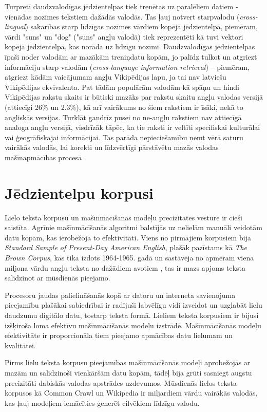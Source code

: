 Turpretī daudzvalodīgas jēdzientelpas tiek trenētas uz paralēliem datiem - vienādas nozīmes tekstiem dažādās valodās. Tas ļauj notvert starpvalodu (\textit{cross-lingual}) sakarības starp līdzīgas nozīmes vārdiem kopējā jēdzientelpā, piemēram, vārdi "suns" un "dog" ("suns" angļu valodā) tiek reprezentēti kā tuvi vektori kopējā jēdzientelpā, kas norāda uz līdzīgu nozīmi. Daudzvalodīgas jēdzientelpas īpaši noder valodām ar mazākām treniņdatu kopām, jo palīdz tulkot un atgriezt informāciju starp valodām (\textit{cross-language information retrieval}) -- piemēram, atgriezt kādām vaicājumam angļu Vikipēdijas lapu, ja tai nav latviešu Vikipēdijas ekvivalenta. Pat tādām populārām valodām kā spāņu un hindi Vikipēdijas rakstu skaits ir būtiski mazāks par rakstu skaitu angļu valodas versijā (attiecīgi 26\% un 2.3\%), kā arī vairākums no šiem rakstiem ir īsāki, nekā to angliskās versijas. Turklāt gandrīz pusei no ne-angļu rakstiem nav attiecīgā analoga angļu versijā, visdrīzāk tāpēc, ka tie raksti ir veltīti specifiskai kulturālai vai ģeogrāfiskajai informācijai. Tas parāda nepieciešamību ņemt vērā saturu vairākās valodās, lai korekti un līdzvērtīgi pārstāvētu mazās valodas mašīnapmācības procesā \cite{roy2020}.


\section{Jēdzientelpu korpusi}


Lielo teksta korpusu un mašīnmācīšanās modeļu precizitātes vēsture ir cieši saistīta. Agrīnie mašīnmācīšanās algoritmi balstījās uz nelielām manuāli veidotām datu kopām, kas ierobežoja to efektivitāti. Viens no pirmajiem korpusiem bija \textit{Standard Sample of Present-Day American English}, plašāk pazīstams kā \textit{The Brown Corpus}, kas tika izdots 1964-1965. gadā un sastāvēja no apmēram viena miljona vārdu angļu teksta no dažādiem avotiem \cite{brown-corpus}, tas ir mazs apjoms teksta salīdzinot ar mūsdienās pieejamo.

Procesoru jaudas palielināšanās kopā ar datoru un interneta savienojuma pieejamību plašākai sabiedrībai ir radījuši labvēlīgu vidi izveidot un uzglabāt lielu daudzumu digitālo datu, tostarp teksta formā. Lieliem teksta korpusiem ir bijusi izšķiroša loma efektīvu mašīnmācīšanās modeļu izstrādē. Mašīnmācīšanās modeļu efektivitāte ir proporcionāla tiem pieejamo apmācības datu lielumam un kvalitātei. %

Pirms lielu teksta korpusu pieejamības mašīnmācīšanās modeļi aprobežojās ar mazām un salīdzinoši vienkāršām datu kopām, tādēļ bija grūti sasniegt augstu precizitāti dabiskās valodas apstrādes uzdevumos. Mūsdienās lielos teksta korpusos kā Common Crawl un Wikipedia ir miljardiem vārdu vairākās valodās, kas ļauj modeļiem iemācīties ģenerēt cilvēkiem līdzīgu valodu.

